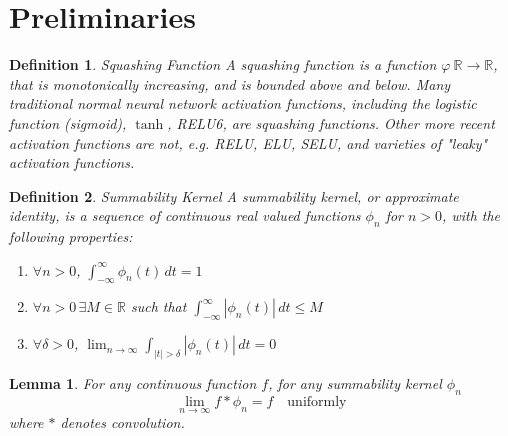 \documentclass{article} %
\newtheorem{lem}[thm]{Lemma}
\newtheorem{defn}{Definition}
\newcommand{\R}{\mathbb{R}}
\begin{document}
\section{Preliminaries}

\begin{defn}{Squashing Function}
A squashing function is a function $\varphi\:\R \to \R$, that is monotonically increasing, and is bounded above and below.
Many traditional normal neural network activation functions, including the logistic function (sigmoid), $\tanh$, RELU6, are squashing functions.
Other more recent activation functions are not, e.g. RELU, ELU, SELU, and varieties of "leaky" activation functions.
\end{defn}





\begin{defn}{Summability Kernel}
A summability kernel, or approximate identity, is a sequence of continuous real valued functions $\phi_n$ for $n>0$, with the following properties:
\begin{enumerate}
	\item $\forall n>0$, $\int_{-\infty}^{\infty}\phi_{n}(t)\,dt=1$
	\item $\forall n>0\, \exists M \in \R$ such that $\int_{-\infty}^{\infty}|\phi_{n}(t)|\,dt\le M$
	\item $\forall \delta > 0$, ${\displaystyle \lim_{n\to\infty}}\int_{|t|>\delta}|\phi_{n}(t)|\,dt = 0$
\end{enumerate}
\end{defn}

\begin{lem}
	For any continuous function $f$,
	for any summability kernel $\phi_n$
	\begin{equation}
	\lim_{n\to \infty} f \ast \phi_n = f \quad \text{uniformly}
	\end{equation}
	where $\ast$ denotes convolution.
	
\end{lem}
\end{document}
